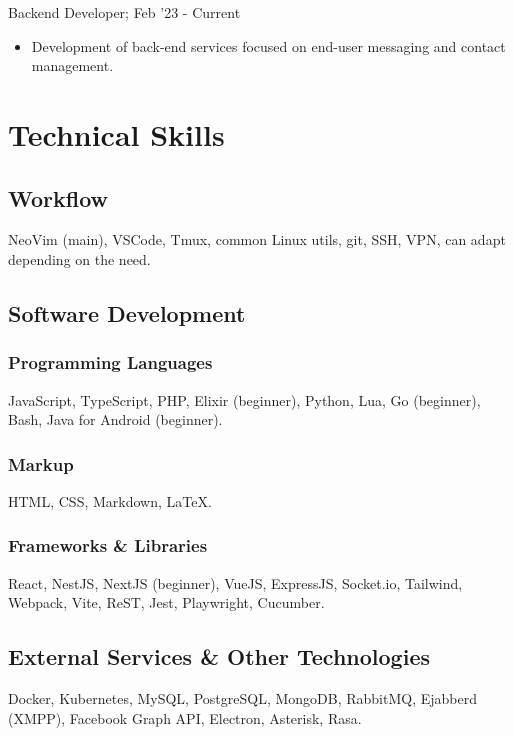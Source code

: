 \documentclass[letterpaper]{article}
\begin{document}
Backend Developer; Feb '23 - Current

\begin{itemize}
  \item Development of back-end services focused on end-user messaging and contact management.
\end{itemize}

\section{Technical Skills}

\subsection{Workflow}

NeoVim (main), VSCode, Tmux, common Linux utils, git, SSH, VPN, can adapt depending on the need.

\subsection{Software Development}

\subsubsection{Programming Languages}

JavaScript, TypeScript, PHP, Elixir (beginner), Python, Lua, Go (beginner), Bash, Java for Android (beginner).

\subsubsection{Markup}

HTML, CSS, Markdown, \LaTeX{}.

\subsubsection{Frameworks \& Libraries}

React, NestJS, NextJS (beginner), VueJS, ExpressJS, Socket.io, Tailwind, Webpack, Vite, ReST, Jest, Playwright, Cucumber.

\subsection{External Services \& Other Technologies}

Docker, Kubernetes, MySQL, PostgreSQL, MongoDB, RabbitMQ, Ejabberd (XMPP), Facebook Graph API, Electron, Asterisk, Rasa.
\end{document}
